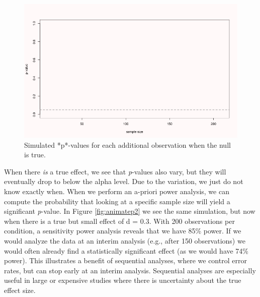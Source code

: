 \documentclass[
  oneside]{book}
\begin{document}
\begin{figure}

{\centering \includegraphics[width=1\linewidth]{images/animatep} 

}

\caption{Simulated *p*-values for each additional observation when the null is true.}\label{fig:animatep}
\end{figure}

When there \emph{is} a true effect, we see that \emph{p}-values also vary, but they will eventually drop to below the alpha level. Due to the variation, we just do not know exactly when. When we perform an a-priori power analysis, we can compute the probability that looking at a specific sample size will yield a significant \emph{p}-value. In Figure \ref{fig:animatep2} we see the same simulation, but now when there is a true but small effect of d = 0.3. With 200 observations per condition, a sensitivity power analysis reveals that we have 85\% power. If we would analyze the data at an interim analysis (e.g., after 150 observations) we would often already find a statistically significant effect (as we would have 74\% power). This illustrates a benefit of sequential analyses, where we control error rates, but can stop early at an interim analysis. Sequential analyses are especially useful in large or expensive studies where there is uncertainty about the true effect size.
\end{document}
